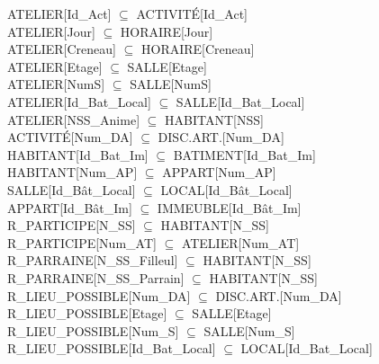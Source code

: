 \documentclass[a4paper,10.5pt]{report}
\begin{document}
	ATELIER[Id\_Act] $\subseteq$ ACTIVITÉ[Id\_Act] \\

	ATELIER[Jour] $\subseteq$ HORAIRE[Jour] \\

	ATELIER[Creneau] $\subseteq$ HORAIRE[Creneau] \\

	ATELIER[Etage] $\subseteq$ SALLE[Etage] \\

	ATELIER[NumS] $\subseteq$ SALLE[NumS] \\

	ATELIER[Id\_Bat\_Local] $\subseteq$ SALLE[Id\_Bat\_Local] \\

	ATELIER[NSS\_Anime] $\subseteq$ HABITANT[NSS] \\

	ACTIVITÉ[Num\_DA] $\subseteq$ DISC.ART.[Num\_DA] \\

	HABITANT[Id\_Bat\_Im] $\subseteq$ BATIMENT[Id\_Bat\_Im] \\

	HABITANT[Num\_AP] $\subseteq$ APPART[Num\_AP] \\

	SALLE[Id\_Bât\_Local] $\subseteq$ LOCAL[Id\_Bât\_Local] \\

	APPART[Id\_Bât\_Im] $\subseteq$ IMMEUBLE[Id\_Bât\_Im] \\

	R\_PARTICIPE[N\_SS]  $\subseteq$ HABITANT[N\_SS] \\

	R\_PARTICIPE[Num\_AT] $\subseteq$ ATELIER[Num\_AT] \\

	R\_PARRAINE[N\_SS\_Filleul] $\subseteq$ HABITANT[N\_SS] \\

	R\_PARRAINE[N\_SS\_Parrain] $\subseteq$ HABITANT[N\_SS] \\

	R\_LIEU\_POSSIBLE[Num\_DA] $\subseteq$ DISC.ART.[Num\_DA] \\

	R\_LIEU\_POSSIBLE[Etage] $\subseteq$ SALLE[Etage] \\

	R\_LIEU\_POSSIBLE[Num\_S] $\subseteq$ SALLE[Num\_S] \\

	R\_LIEU\_POSSIBLE[Id\_Bat\_Local] $\subseteq$ LOCAL[Id\_Bat\_Local] \\
\end{document}

